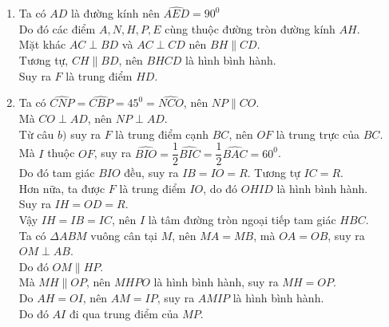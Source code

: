 \begin{ex}
{\begin{enumerate}
			Tứ giác $BCNP$ nội tiếp đường tròn đường kính $BC$, suy ra:\\
			$\widehat{HPN}=90^0-\widehat{PNB}=90^0-\widehat{ACB}=90^0-15^0=75^0$\\
			Ta có: $\widehat{NPA}=\widehat{ACB}=\widehat{APM}$, nên $\widehat{NPM}=2\widehat{ACB}=30^0$.\\
			Tương tự, $\widehat{MNP}=2\widehat{CBA}=90^0$.\\
			Do đó: $\dfrac{MN}{MP}=sin\widehat{NPM}=sin30^0=\dfrac{1}{2}$ .
			\item  Ta có $AD$ là đường kính nên $\widehat{AED}=90^0$\\
			Do đó các điểm $A, N, H, P, E$ cùng thuộc đường tròn đường kính $AH$.\\
			Mặt khác $AC\perp BD$ và $AC\perp CD$ nên $BH\parallel CD$.\\
			Tương tự, $CH\parallel BD$, nên $BHCD$ là hình bình hành.\\
			Suy ra $F$ là trung điểm $HD$.
			\item Ta có $\widehat{CNP}=\widehat{CBP}=45^0=\widehat{NCO}$, nên $NP\parallel CO$.\\
			Mà $CO\perp AD$, nên $NP\perp AD$.\\
			Từ câu $b)$ suy ra $F$ là trung điểm cạnh $BC$, nên $OF$ là trung trực của $BC$.\\
			Mà $I$ thuộc $OF$, suy ra $\widehat{BIO}=\dfrac{1}{2}\widehat{BIC}=\dfrac{1}{2}\widehat{BAC}=60^0$.\\
			Do đó tam giác $BIO$ đều, suy ra $IB=IO=R$. Tương tự $IC=R$.\\
			Hơn nữa, ta được $F$ là trung điểm $IO$, do đó $OHID$ là hình bình hành.\\ Suy ra $IH=OD=R$.\\
			Vậy $IH=IB=IC$, nên $I$ là tâm đường tròn ngoại tiếp tam giác $HBC$.\\
			Ta có $\Delta ABM$ vuông cân tại $M$, nên $MA=MB$, mà $OA=OB$, suy ra $OM\perp AB$.\\ Do đó $OM\parallel HP$.\\
			Mà $MH\parallel OP$, nên $MHPO$ là hình bình hành, suy ra $MH=OP$.\\
			Do $AH=OI$, nên $AM=IP$, suy ra $AMIP$ là hình bình hành.\\
			Do đó $AI$ đi qua trung điểm của $MP$.
			
		\end{enumerate}
	}
\end{ex}


